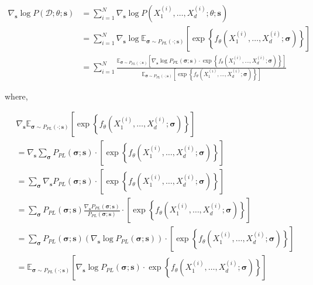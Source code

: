 \documentclass{article}
\begin{document}
\begin{align}
\nabla_{\boldsymbol{s}}\log P(\mathcal{D};\theta; \boldsymbol{s}) &= \sum_{i=1}^N \nabla_{\boldsymbol{s}} \log P(X^{(i)}_1, \ldots, X^{(i)}_d;\theta; \boldsymbol{s})\\
 &= \sum_{i=1}^N \nabla_{\boldsymbol{s}}\log \mathbb{E}_{\boldsymbol{\sigma} \sim P_{PL}(\cdot; \boldsymbol{s})} \left[\exp \left\{ f_\theta\left(X^{(i)}_1, \ldots, X^{(i)}_d; \boldsymbol{\sigma}\right) \right\}\right]\\
  &= \sum_{i=1}^N \frac{\mathbb{E}_{\boldsymbol{\sigma} \sim P_{PL}(\cdot; \boldsymbol{s})} \left[\nabla_{\boldsymbol{s}} \log P_{PL}(\boldsymbol{\sigma}; \boldsymbol{s}) \cdot \exp \left\{ f_\theta\left(X^{(i)}_1, \ldots, X^{(i)}_d; \boldsymbol{\sigma}\right) \right\}\right]}{\mathbb{E}_{\boldsymbol{\sigma} \sim P_{PL}(\cdot; \boldsymbol{s})} \left[\exp \left\{ f_\theta\left(X^{(i)}_1, \ldots, X^{(i)}_d; \boldsymbol{\sigma}\right) \right\}\right]}
\end{align}


where,

\begin{align}
&\nabla_{\boldsymbol{s}}\mathbb{E}_{\boldsymbol{\sigma} \sim P_{PL}(\cdot; \boldsymbol{s})} \left[\exp \left\{ f_\theta\left(X^{(i)}_1, \ldots, X^{(i)}_d; \boldsymbol{\sigma}\right) \right\}\right]\\
 & = \nabla_{\boldsymbol{s}}\sum_{\boldsymbol{\sigma}} P_{PL}(\boldsymbol{\sigma}; \boldsymbol{s}) \cdot \left[\exp \left\{ f_\theta\left(X^{(i)}_1, \ldots, X^{(i)}_d; \boldsymbol{\sigma}\right) \right\}\right] \\
& = \sum_{\boldsymbol{\sigma}} \nabla_{\boldsymbol{s}} P_{PL}(\boldsymbol{\sigma}; \boldsymbol{s}) \cdot \left[\exp \left\{ f_\theta\left(X^{(i)}_1, \ldots, X^{(i)}_d; \boldsymbol{\sigma}\right) \right\}\right] \\
& = \sum_{\boldsymbol{\sigma}} P_{PL}(\boldsymbol{\sigma}; \boldsymbol{s}) \frac{\nabla_{\boldsymbol{s}} P_{PL}(\boldsymbol{\sigma}; \boldsymbol{s})}{P_{PL}(\boldsymbol{\sigma}; \boldsymbol{s})} \cdot \left[\exp \left\{ f_\theta\left(X^{(i)}_1, \ldots, X^{(i)}_d; \boldsymbol{\sigma}\right) \right\}\right] \\
& = \sum_{\boldsymbol{\sigma}} P_{PL}(\boldsymbol{\sigma}; \boldsymbol{s}) \left(\nabla_{\boldsymbol{s}} \log P_{PL}(\boldsymbol{\sigma}; \boldsymbol{s})\right) \cdot \left[\exp \left\{ f_\theta\left(X^{(i)}_1, \ldots, X^{(i)}_d; \boldsymbol{\sigma}\right) \right\}\right] \\
& =  \mathbb{E}_{\boldsymbol{\sigma} \sim P_{PL}(\cdot; \boldsymbol{s})} \left[\nabla_{\boldsymbol{s}} \log P_{PL}(\boldsymbol{\sigma}; \boldsymbol{s}) \cdot \exp \left\{ f_\theta\left(X^{(i)}_1, \ldots, X^{(i)}_d; \boldsymbol{\sigma}\right) \right\}\right]
\end{align}
\end{document}
